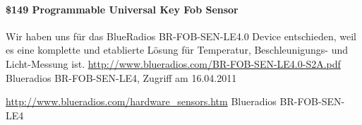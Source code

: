 \begin{appendix}
	\paragraph{\$149 Programmable Universal Key Fob Sensor}
		Wir haben uns für das BlueRadios BR-FOB-SEN-LE4.0 Device  entschieden, weil es
		eine komplette und etablierte Lösung für Temperatur, Beschleunigungs- und
		Licht-Messung ist.
		\url{http://www.blueradios.com/BR-FOB-SEN-LE4.0-S2A.pdf}
		{Blueradios BR-FOB-SEN-LE4, Zugriff am 16.04.2011}
		
		\url{http://www.blueradios.com/hardware_sensors.htm}
		{Blueradios BR-FOB-SEN-LE4}
	\par
	
\end{appendix}
